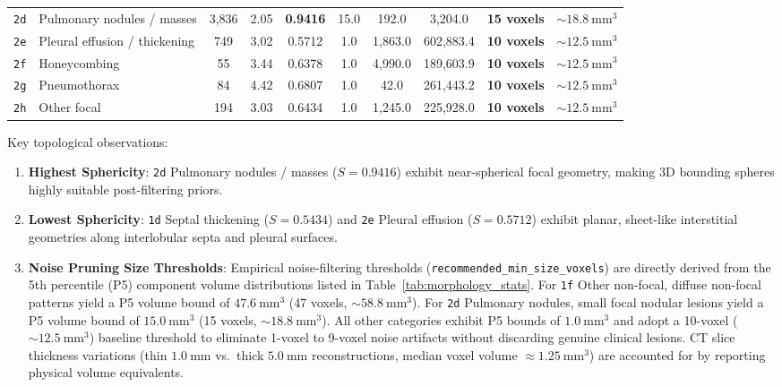 \documentclass[11pt,a4paper]{article}
\begin{document}
\begin{table}[htbp]
\begin{tabularx}{\linewidth}{c >{\raggedright\arraybackslash}X c c c c c c c c}
\texttt{2d} & Pulmonary nodules / masses & 3,836 & 2.05 & \textbf{0.9416} & 15.0 & 192.0 & 3,204.0 & \textbf{15 voxels} & $\sim 18.8~\text{mm}^3$ \\
\texttt{2e} & Pleural effusion / thickening & 749 & 3.02 & 0.5712 & 1.0 & 1,863.0 & 602,883.4 & \textbf{10 voxels} & $\sim 12.5~\text{mm}^3$ \\
\texttt{2f} & Honeycombing & 55 & 3.44 & 0.6378 & 1.0 & 4,990.0 & 189,603.9 & \textbf{10 voxels} & $\sim 12.5~\text{mm}^3$ \\
\texttt{2g} & Pneumothorax & 84 & 4.42 & 0.6807 & 1.0 & 42.0 & 261,443.2 & \textbf{10 voxels} & $\sim 12.5~\text{mm}^3$ \\
\texttt{2h} & Other focal & 194 & 3.03 & 0.6434 & 1.0 & 1,245.0 & 225,928.0 & \textbf{10 voxels} & $\sim 12.5~\text{mm}^3$ \\
\bottomrule
\end{tabularx}
\end{table}

Key topological observations:
\begin{enumerate}
    \item \textbf{Highest Sphericity}: \texttt{2d} Pulmonary nodules / masses ($S = 0.9416$) exhibit near-spherical focal geometry, making 3D bounding spheres highly suitable post-filtering priors.
    \item \textbf{Lowest Sphericity}: \texttt{1d} Septal thickening ($S = 0.5434$) and \texttt{2e} Pleural effusion ($S = 0.5712$) exhibit planar, sheet-like interstitial geometries along interlobular septa and pleural surfaces.
    \item \textbf{Noise Pruning Size Thresholds}: Empirical noise-filtering thresholds (\texttt{recommended\_min\_size\_voxels}) are directly derived from the 5th percentile (P5) component volume distributions listed in Table~\ref{tab:morphology_stats}. For \texttt{1f} Other non-focal, diffuse non-focal patterns yield a P5 volume bound of $47.6~\text{mm}^3$ (47 voxels, $\sim 58.8~\text{mm}^3$). For \texttt{2d} Pulmonary nodules, small focal nodular lesions yield a P5 volume bound of $15.0~\text{mm}^3$ (15 voxels, $\sim 18.8~\text{mm}^3$). All other categories exhibit P5 bounds of $1.0~\text{mm}^3$ and adopt a 10-voxel ($\sim 12.5~\text{mm}^3$) baseline threshold to eliminate 1-voxel to 9-voxel noise artifacts without discarding genuine clinical lesions. CT slice thickness variations (thin $1.0~\text{mm}$ vs.\ thick $5.0~\text{mm}$ reconstructions, median voxel volume $\approx 1.25~\text{mm}^3$) are accounted for by reporting physical volume equivalents.
\end{enumerate}
\end{document}
